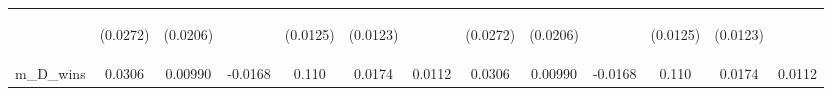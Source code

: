 \documentclass[]{article}
\begin{document}
\begin{center}
\begin{tabular}{lcccccccccccc}
\vspace{4pt} & \begin{footnotesize}(0.0272)\end{footnotesize} & \begin{footnotesize}(0.0206)\end{footnotesize} & \begin{footnotesize}\end{footnotesize} & \begin{footnotesize}(0.0125)\end{footnotesize} & \begin{footnotesize}(0.0123)\end{footnotesize} & \begin{footnotesize}\end{footnotesize} & \begin{footnotesize}(0.0272)\end{footnotesize} & \begin{footnotesize}(0.0206)\end{footnotesize} & \begin{footnotesize}\end{footnotesize} & \begin{footnotesize}(0.0125)\end{footnotesize} & \begin{footnotesize}(0.0123)\end{footnotesize} & \begin{footnotesize}\end{footnotesize} \\
m\_D\_wins & 0.0306 & 0.00990 & -0.0168 & 0.110 & 0.0174 & 0.0112 & 0.0306 & 0.00990 & -0.0168 & 0.110 & 0.0174 & 0.0112 \\

\end{tabular}
\end{center}
\end{document}
